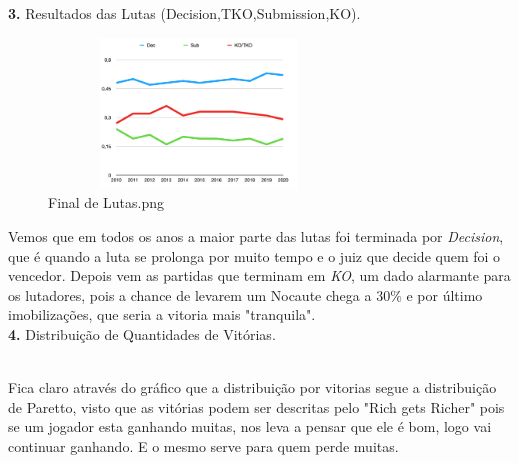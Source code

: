 \documentclass{article}
\begin{document}
\newpage
\textbf{3.} Resultados das Lutas (Decision,TKO,Submission,KO).
\begin{figure}[H]
    \centering
    \includegraphics[width=8cm,height=4cm]{Final de Lutas.png}
    \caption{Final de Lutas.png}
    \label{fig:my_label}
\end{figure}
Vemos que em todos os anos a maior parte das lutas foi terminada por \textit{Decision}, que é quando a luta se prolonga por muito tempo e o juiz que decide quem foi o vencedor.  Depois vem as partidas que terminam em \textit{KO},  um dado alarmante para os lutadores, pois a chance de levarem um Nocaute chega a $30\% $ e por último imobilizações, que seria a vitoria mais "tranquila".\\

\textbf{4.} Distribuição de Quantidades de Vitórias.
\begin{figure}[H]
\centering
{}
\end{figure} \\
Fica claro através do gráfico que a distribuição por vitorias segue a distribuição de Paretto, visto que as vitórias podem ser descritas pelo "Rich gets Richer" pois se um jogador esta ganhando muitas,  nos leva a pensar que ele é bom, logo vai continuar ganhando. E o mesmo serve para quem perde muitas.\\
\end{document}
